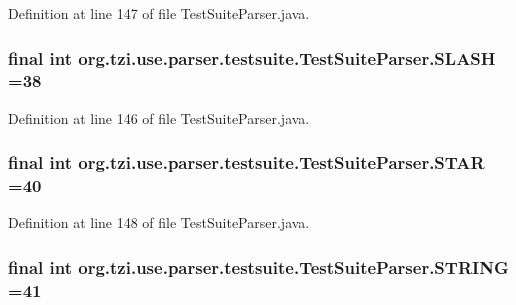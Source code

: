 Definition at line 147 of file Test\-Suite\-Parser.\-java.

\hypertarget{classorg_1_1tzi_1_1use_1_1parser_1_1testsuite_1_1_test_suite_parser_a94ce099c5691965cbf208fa768c00b91}{
\subsubsection[{S\-L\-A\-S\-H}]{\setlength{\rightskip}{0pt plus 5cm}final int org.\-tzi.\-use.\-parser.\-testsuite.\-Test\-Suite\-Parser.\-S\-L\-A\-S\-H =38\hspace{0.3cm}{\ttfamily [static]}}}\label{classorg_1_1tzi_1_1use_1_1parser_1_1testsuite_1_1_test_suite_parser_a94ce099c5691965cbf208fa768c00b91}


Definition at line 146 of file Test\-Suite\-Parser.\-java.

\hypertarget{classorg_1_1tzi_1_1use_1_1parser_1_1testsuite_1_1_test_suite_parser_a93b8bfc83bb08a4efe62e15686e99d78}{
\subsubsection[{S\-T\-A\-R}]{\setlength{\rightskip}{0pt plus 5cm}final int org.\-tzi.\-use.\-parser.\-testsuite.\-Test\-Suite\-Parser.\-S\-T\-A\-R =40\hspace{0.3cm}{\ttfamily [static]}}}\label{classorg_1_1tzi_1_1use_1_1parser_1_1testsuite_1_1_test_suite_parser_a93b8bfc83bb08a4efe62e15686e99d78}


Definition at line 148 of file Test\-Suite\-Parser.\-java.

\hypertarget{classorg_1_1tzi_1_1use_1_1parser_1_1testsuite_1_1_test_suite_parser_a49529bd30a8b1ad4b7d1ad0adbd93103}{
\subsubsection[{S\-T\-R\-I\-N\-G}]{\setlength{\rightskip}{0pt plus 5cm}final int org.\-tzi.\-use.\-parser.\-testsuite.\-Test\-Suite\-Parser.\-S\-T\-R\-I\-N\-G =41\hspace{0.3cm}{\ttfamily [static]}}}\label{classorg_1_1tzi_1_1use_1_1parser_1_1testsuite_1_1_test_suite_parser_a49529bd30a8b1ad4b7d1ad0adbd93103}


